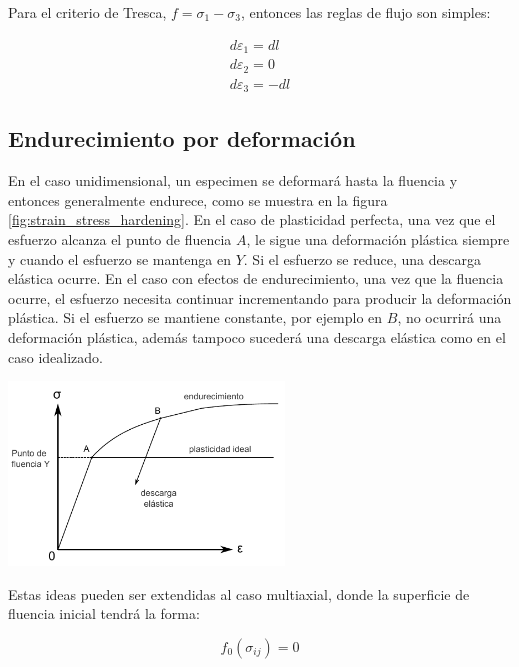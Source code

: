 Para el criterio de Tresca, $f = \sigma_1 - \sigma_3$, entonces las reglas de flujo son simples:
~\cite{hosford2007}

\begin{align*}
d\varepsilon_1 = dl \\
d\varepsilon_2 = 0 \\
d\varepsilon_3 = -dl
\end{align*}


\subsection{Endurecimiento por deformación}

En el caso unidimensional, un especimen se deformará hasta la fluencia y entonces generalmente 
endurece, como se muestra en la figura \ref{fig:strain_stress_hardening}. En el caso de 
plasticidad perfecta, una vez que el esfuerzo alcanza el punto de fluencia $A$, le sigue una 
deformación plástica siempre y cuando el esfuerzo se mantenga en $Y$. Si el esfuerzo se reduce, 
una descarga elástica ocurre. En el caso con efectos de endurecimiento, una vez que la fluencia 
ocurre, el esfuerzo necesita continuar incrementando para producir la deformación plástica. 
Si el esfuerzo se mantiene constante, por ejemplo en $B$, no ocurrirá una deformación plástica, 
además tampoco sucederá una descarga elástica como en el caso idealizado. ~\cite{kelly2012}

\begin{center}
\includegraphics[width=0.55\textwidth]{src/ch2/strain_stress_hardening}
\label{fig:strain_stress_hardening}
\end{center}

Estas ideas pueden ser extendidas al caso multiaxial, donde la superficie de fluencia inicial 
tendrá la forma:

\begin{equation}
f_0 (\sigma_{ij}) = 0
\end{equation}

